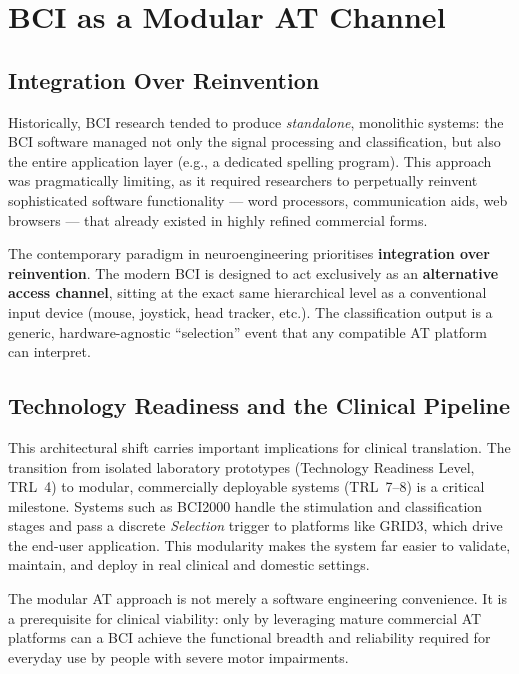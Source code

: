 \documentclass[10pt, letterpaper]{report}
\begin{document}
\section{BCI as a Modular AT Channel}

\subsection{Integration Over Reinvention}

Historically, BCI research tended to produce \emph{standalone}, monolithic systems: the
BCI software managed not only the signal processing and classification, but also the entire
application layer (e.g., a dedicated spelling program). This approach was pragmatically
limiting, as it required researchers to perpetually reinvent sophisticated software
functionality — word processors, communication aids, web browsers — that already existed
in highly refined commercial forms.

The contemporary paradigm in neuroengineering prioritises \textbf{integration over
reinvention}. The modern BCI is designed to act exclusively as an \textbf{alternative access
channel}, sitting at the exact same hierarchical level as a conventional input device (mouse,
joystick, head tracker, etc.). The classification output is a generic, hardware-agnostic
``selection'' event that any compatible AT platform can interpret.

\subsection{Technology Readiness and the Clinical Pipeline}

This architectural shift carries important implications for clinical translation. The transition
from isolated laboratory prototypes (Technology Readiness Level, TRL~4) to modular,
commercially deployable systems (TRL~7--8) is a critical milestone. Systems such as
BCI2000 handle the stimulation and classification stages and pass a discrete
\emph{Selection} trigger to platforms like GRID3, which drive the end-user application.
This modularity makes the system far easier to validate, maintain, and deploy in real
clinical and domestic settings.

\begin{boxobservation}{}{}
The modular AT approach is not merely a software engineering convenience. It is a
prerequisite for clinical viability: only by leveraging mature commercial AT platforms can a
BCI achieve the functional breadth and reliability required for everyday use by people with
severe motor impairments.
\end{boxobservation}
\end{document}
